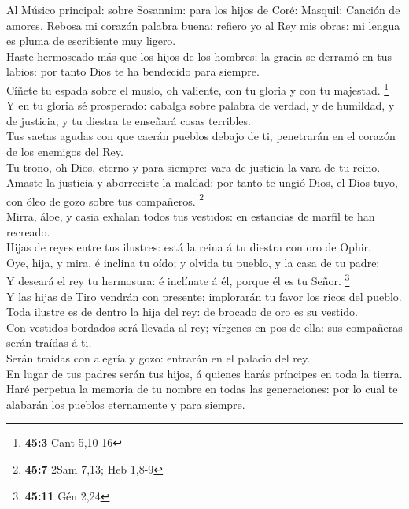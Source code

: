  Al Músico principal: sobre Sosannim: para los hijos de
Coré: Masquil: Canción de amores. Rebosa mi corazón palabra buena:
refiero yo al Rey mis obras: mi lengua es pluma de escribiente muy
ligero.\\
 Haste hermoseado más que los hijos de los hombres; la
gracia se derramó en tus labios: por tanto Dios te ha bendecido para
siempre.\\
 Cíñete tu espada sobre el muslo, oh valiente, con tu
gloria y con tu majestad. \footnote{\textbf{45:3} Cant 5,10-16}\\
 Y en tu gloria sé prosperado: cabalga sobre palabra de
verdad, y de humildad, y de justicia; y tu diestra te enseñará cosas
terribles.\\
 Tus saetas agudas con que caerán pueblos debajo de ti,
penetrarán en el corazón de los enemigos del Rey.\\
 Tu trono, oh Dios, eterno y para siempre: vara de
justicia la vara de tu reino.\\
 Amaste la justicia y aborreciste la maldad: por tanto te
ungió Dios, el Dios tuyo, con óleo de gozo sobre tus compañeros.
\footnote{\textbf{45:7} 2Sam 7,13; Heb 1,8-9}\\
 Mirra, áloe, y casia exhalan todos tus vestidos: en
estancias de marfil te han recreado.\\
 Hijas de reyes entre tus ilustres: está la reina á tu
diestra con oro de Ophir.\\
 Oye, hija, y mira, é inclina tu oído; y olvida tu
pueblo, y la casa de tu padre;\\
 Y deseará el rey tu hermosura: é inclínate á él, porque
él es tu Señor. \footnote{\textbf{45:11} Gén 2,24}\\
 Y las hijas de Tiro vendrán con presente; implorarán tu
favor los ricos del pueblo.\\
 Toda ilustre es de dentro la hija del rey: de brocado de
oro es su vestido.\\
 Con vestidos bordados será llevada al rey; vírgenes en
pos de ella: sus compañeras serán traídas á ti.\\
 Serán traídas con alegría y gozo: entrarán en el palacio
del rey.\\
 En lugar de tus padres serán tus hijos, á quienes harás
príncipes en toda la tierra.\\
 Haré perpetua la memoria de tu nombre en todas las
generaciones: por lo cual te alabarán los pueblos eternamente y para
siempre.

